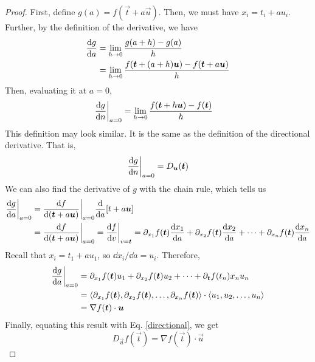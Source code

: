 \begin{proof}
    First, define \(g(a) = f(\vec t + a\vec u)\). Then, we must have \(x_i = t_i + au_i\). Further, by the definition of the derivative, we have
    \begin{align*}
        \dv{g}{a} &= \lim_{h\to 0}\frac{g(a+h)-g(a)}{h} \\
        &= \lim_{h\to 0}\frac{f(\boldsymbol{t}+(a+h)\boldsymbol{u}) - f(\boldsymbol{t} + a\boldsymbol{u})}{h}
    \end{align*}
    Then, evaluating it at \(a=0\),
    \begin{align*}
        \dv{g}{n}\biggr|_{a=0} &= \lim_{h\to 0}\frac{f(\boldsymbol{t} + h\boldsymbol{u})-f(\boldsymbol{t})}{h}
    \end{align*}
    This definition may look similar. It is the same as the definition of the directional derivative. That is,
    \begin{equation}\label{directional}
     \dv{g}{n}\biggr|_{a=0} = D_{\boldsymbol{u}}(\boldsymbol{t})
    \end{equation} We can also find the derivative of \(g\) with the chain rule, which tells us
    \begin{align*}
        \dv{g}{a}\biggr|_{a=0} &= \dv{f}{(\vec t + a\vec u)}\biggr|_{a=0}\dv{a}\bqty{t+a\vec u} \\
        &=\dv{f}{(\vec t + a\vec u)}\biggr|_{a=0} = \dv{f}{v}\biggr|_{v=\vec t} = \partial_{x_1}f(\vec t)\dv{x_1}{a} +\partial_{x_2}f(\vec t)\dv{x_2}{a} + \cdots + \partial_{x_n}f(\vec t)\dv{x_n}{a} 
    \end{align*}
    Recall that \(x_i = t_1+au_1\), so \(\dd x_i/\dd a = u_i\). Therefore,
    \begin{align*}
        \dv{g}{a}\biggr|_{a=0} &= \partial_{x_1}f(\boldsymbol{t})u_1 + \partial_{x_2}f(\boldsymbol{t})u_2 + \cdots + \partial_{\boldsymbol{t}}f(t_n){x_n}u_n \\
        &= \left\langle \partial_{x_1}f(\boldsymbol{t}), \partial_{x_2}f(\boldsymbol{t}), \dots, \partial_{x_n}f(\boldsymbol{t}) \right\rangle \cdot \left\langle u_1, u_2, \dots, u_n\right\rangle \\
        &= \nabla f(\boldsymbol{t}) \cdot \boldsymbol{u}
    \end{align*}
    Finally, equating this result with Eq. \ref{directional}, we get
    \[ D_{\vec u}f(\vec t) = \nabla f(\vec t) \cdot \vec u\]
\end{proof}

